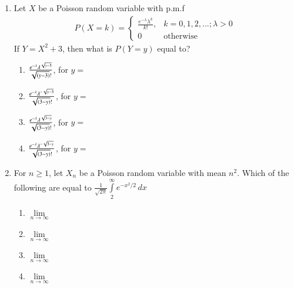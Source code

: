 \renewcommand{\theequation}{\theenumi}
\renewcommand{\thefigure}{\theenumi}
\renewcommand{\thetable}{\theenumi}
\begin{enumerate}[label=\thesection.\arabic*.,ref=\thesection.\theenumi]

\item Let $X$ be a Poisson random variable with p.m.f
\begin{align}
\label{poisson/1/eq:1}
P(X=k) = 
    \begin{cases} 
      \frac{e^{-\lambda}\lambda^{k}}{k!},& k=0,1,2,...;  \lambda > 0\\
      0 & \text{otherwise}
   \end{cases}
\end{align}
If $Y = X^2 + 3$, then what is $P(Y=y)$ equal to?
\begin{enumerate}[label={(\Alph*)}]
    \item $\frac{e^{-\lambda}\lambda^{\sqrt{y-3}}}{\sqrt{\left(y-3\right)}!}$, for $y =$ 
    \item $\frac{e^{-\lambda}\lambda^{-\sqrt{y-3}}}{\sqrt{\left(3-y\right)}!}$, for $y =$ 
    \item $\frac{e^{-\lambda}\lambda^{\sqrt{3-y}}}{\sqrt{\left(3-y\right)}!}$, for $y =$ 
    \item $\frac{e^{-\lambda}\lambda^{-\sqrt{3-y}}}{\sqrt{\left(3-y\right)}!}$, for $y =$ 
\end{enumerate}
%
\solution


\item For $n \geq 1$, let $X_n$ be a Poisson random  variable with mean $n^2$.
 Which of the following are equal to
 $\displaystyle{\frac{1}{\sqrt{2\pi}} \int \limits_2^{\infty} e^{-x^2/2}\,dx}$
\begin{enumerate}
    \item $\lim \limits_{n \to \infty} $ 
    \item $\lim \limits_{n \to \infty} $ 
    \item $\lim \limits_{n \to \infty} $ 
    \item $\lim \limits_{n \to \infty} $ 
\end{enumerate}
%
\solution

%
%
\solution



\end{enumerate}
